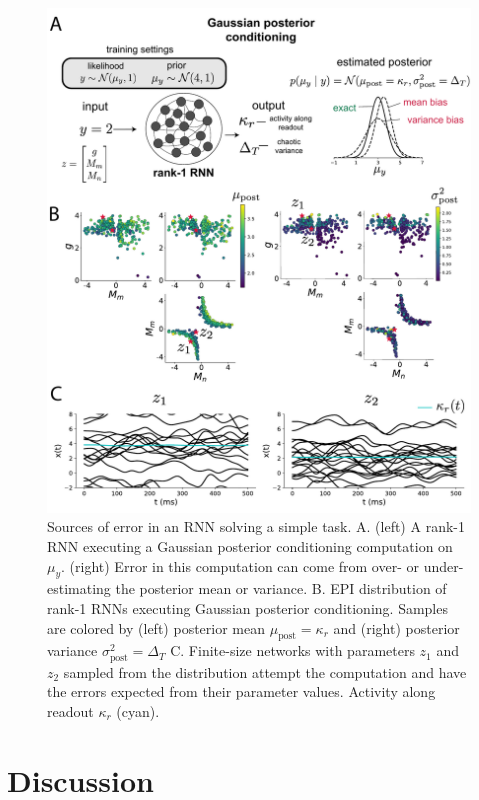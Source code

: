 \documentclass[11pt]{article}
\begin{document}
\begin{figure}
\begin{center}
\includegraphics[scale=0.7]{figures/fig5/fig5.pdf}
\end{center}
\caption{Sources of error in an RNN solving a simple task.  A. (left) A rank-1 RNN executing a Gaussian posterior conditioning computation on $\mu_y$. (right) Error in this computation can come from over- or under-estimating the posterior mean or variance. B. EPI distribution of rank-1 RNNs executing Gaussian posterior conditioning.  Samples are colored by (left) posterior mean $\mu_{\text{post}}=\kappa_r$ and (right) posterior variance $\sigma^2_{\text{post}}=\Delta_T$  C.  Finite-size networks with parameters $z_1$ and $z_2$ sampled from the distribution attempt the computation and have the errors expected from their parameter values.  Activity along readout $\kappa_r$ (cyan).}
\label{fig:RNN}
\end{figure}

\section{Discussion}
\end{document}
